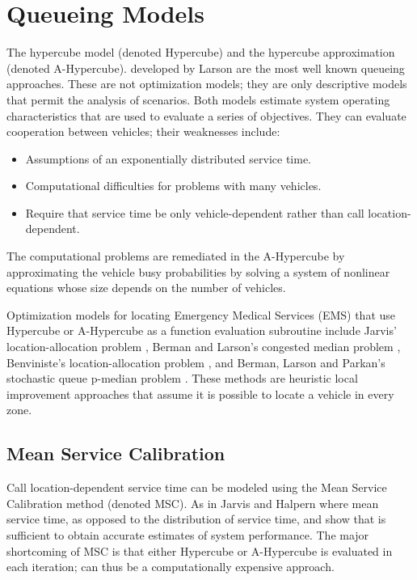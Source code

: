 \section{Queueing Models}
The hypercube model (denoted Hypercube)
and the hypercube approximation (denoted A-Hypercube).
developed by Larson  \cite{larson1974hypercube,larson1975approximating}
are the most well known queueing approaches.
These are not optimization models;
they are only descriptive models
that permit the analysis of scenarios.
Both models
estimate system operating characteristics
that are used to evaluate a series of objectives.
They can evaluate cooperation between vehicles;
their weaknesses include:
\begin{itemize}
\item Assumptions of an exponentially distributed service time.
\item Computational difficulties for problems with many vehicles.
\item Require that service time be only vehicle-dependent
  rather than call location-dependent.
\end{itemize}

The computational problems are remediated in the A-Hypercube
by approximating the vehicle busy probabilities
by solving a system of nonlinear equations
whose size depends on the number of vehicles.

Optimization models for locating Emergency Medical Services (EMS)
that use Hypercube or A-Hypercube as a function evaluation subroutine
include Jarvis' location-allocation problem \cite{jarvis1975optimization},
Berman and Larson's congested median problem \cite{berman1982median},
Benviniste's location-allocation problem \cite{benveniste1985solving},
and Berman, Larson and Parkan's
stochastic queue p-median problem \cite{berman1987stochastic}.
These methods are heuristic local improvement approaches
that assume it is possible to locate a vehicle in every zone.

\subsection{Mean Service Calibration}
Call location-dependent service time
can be modeled using the Mean Service Calibration method (denoted MSC).
As in Jarvis \cite{jarvis1975optimization} 
and Halpern \cite{halpern1977accuracy}
where mean service time,
as opposed to the distribution of service time,
and show that
is sufficient to obtain accurate estimates of system performance.
The major shortcoming of MSC is that either
Hypercube or A-Hypercube
is evaluated in each iteration;
can thus be a computationally expensive approach.

